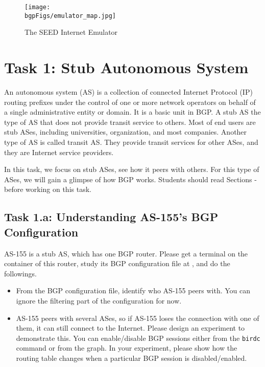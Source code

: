 \begin{figure}[htb]
  \begin{center}
    \texttt{[image: \\bgpFigs/emulator\_map.jpg]}
  \end{center}
  \caption{The SEED Internet Emulator}
  \label{bgp:fig:emulator-map}
\end{figure}
 

\section{Task 1: Stub Autonomous System} 

An autonomous system (AS) is a collection of connected Internet Protocol (IP) routing prefixes
under the control of one or more network operators on behalf of a single administrative entity
or domain. It is a basic unit in BGP. 
A stub AS the type of AS that does not provide transit service to others.
Most of end users are stub ASes, including universities, organization,
and most companies. Another type of AS is called transit AS. They
provide transit services for other ASes, and they 
are Internet service providers.  

In this task, we focus on stub ASes, see how it peers with others. 
For this type of ASes, we will gain a glimpse of how BGP works. 
Students should read Sections \bgpintro - \bgpupdate 
before working on this task. 

\subsection{Task 1.a: Understanding AS-155's BGP Configuration} 

AS-155 is a stub AS, which has one BGP router. Please  
get a terminal on the container of this router, study its 
BGP configuration file at , and
do the followings.

\begin{itemize}
  \item From the BGP configuration file, identify who
    AS-155 peers with. You can ignore the filtering
    part of the configuration for now.

  \item AS-155 peers with several ASes, so if AS-155
    loses the connection with one of them, it can still connect
    to the Internet. Please design an experiment to 
    demonstrate this. You can enable/disable BGP sessions
    either from the \texttt{birdc} command or from the 
    graph.
    In your experiment, please show how the routing table changes when a particular 
    BGP session is disabled/enabled. 
\end{itemize}


